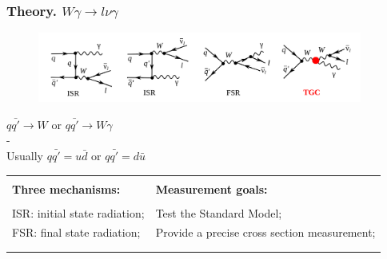 \begin{frame}\frametitle{Theory. $W\gamma\rightarrow l\nu\gamma$}
   \begin{figure}[htb]
      \begin{center}
        \scriptsize
          \includegraphics[width=0.95\textwidth]{../figs/ForPresentation/feynmWg_LO_02.png}
       \end{center}
    \end{figure}
\scriptsize
$q\bar{q'}\rightarrow W$ or $q\bar{q'}\rightarrow W\gamma$\\
-  \\
Usually $q\bar{q'}=u\bar{d}$ or  $q\bar{q'}=d\bar{u}$\\

\begin{table}[h]
  \scriptsize
  \begin{center}
   \begin{tabular}{|l|l|}
    \hline
         &  \\ 
     {\bfseries{Three mechanisms:}}  & {\bfseries{Measurement goals:}}  \\
         &  \\ 
     ISR: initial state radiation;   & Test the Standard Model;  \\ 
     FSR: final state radiation;    &  Provide a precise cross section measurement; \\ 
     {\color{red}{TGC: triple gauge coupling.}}    &  {\color{red}{Search for anomalous TGC (aTGC).}}\\ 
    &  \\  \hline
  \end{tabular}
  \end{center}
\end{table}

\end{frame}%


